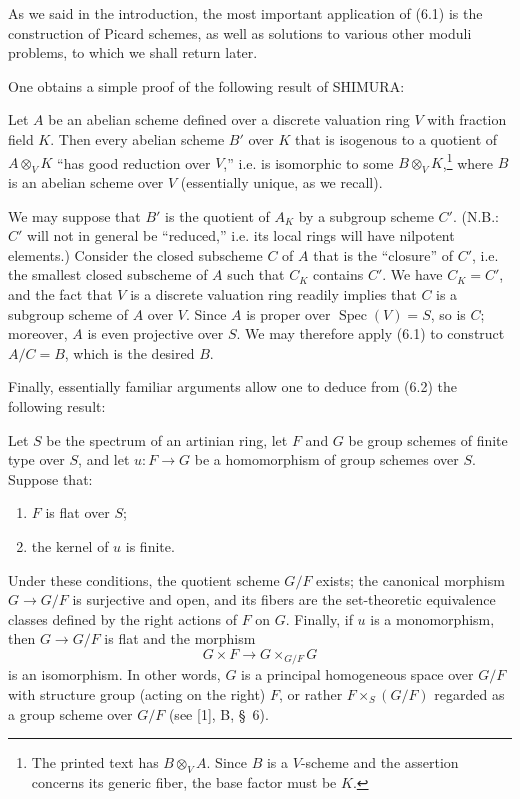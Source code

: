 
As we said in the introduction, the most important application of (6.1) is
the construction of Picard schemes, as well as solutions to various other
moduli problems, to which we shall return later.

One obtains a simple proof of the following result of SHIMURA:

 Let $A$ be an abelian scheme defined over a discrete
valuation ring $V$ with fraction field $K$. Then every abelian scheme $B'$ over
$K$ that is isogenous to a quotient of $A\otimes_V K$ ``has good reduction
over $V$,'' i.e. is isomorphic to some $B\otimes_V K$,\footnote{The printed
text has $B\otimes_V A$. Since $B$ is a $V$-scheme and the assertion concerns
its generic fiber, the base factor must be $K$.} where $B$ is an abelian
scheme over $V$ (essentially unique, as we recall).

We may suppose that $B'$ is the quotient of $A_K$ by a subgroup scheme $C'$.
(N.B.: $C'$ will not in general be ``reduced,'' i.e. its local rings will have
nilpotent elements.) Consider the closed subscheme $C$ of $A$ that is the
``closure'' of $C'$, i.e. the smallest closed subscheme of $A$ such that $C_K$
contains $C'$. We have $C_K=C'$, and the fact that $V$ is a discrete valuation
ring readily implies that $C$ is a subgroup scheme of $A$ over $V$. Since $A$
is proper over $\operatorname{Spec}(V)=S$, so is $C$; moreover, $A$ is even
projective over $S$. We may therefore apply (6.1) to construct $A/C=B$,
which is the desired $B$.

Finally, essentially familiar arguments allow one to deduce from (6.2) the
following result:

 Let $S$ be the spectrum of an artinian ring, let $F$ and
$G$ be group schemes of finite type over $S$, and let $u:F\to G$ be a
homomorphism of group schemes over $S$. Suppose that:
\begin{enumerate}
\item[(i)] $F$ is flat over $S$;
\item[(ii)] the kernel of $u$ is finite.
\end{enumerate}
Under these conditions, the quotient scheme $G/F$ exists; the canonical
morphism $G\to G/F$ is surjective and open, and its fibers are the
set-theoretic equivalence classes defined by the right actions of $F$ on $G$.
Finally, if $u$ is a monomorphism, then $G\to G/F$ is flat and the morphism
\[
  G\times F\longrightarrow G\times_{G/F}G
\]
is an isomorphism. In other words, $G$ is a principal homogeneous space over
$G/F$ with structure group (acting on the right) $F$, or rather
$F\times_S(G/F)$ regarded as a group scheme over $G/F$ (see [1], B, \S~6).

